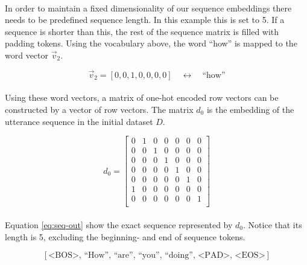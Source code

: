 \documentclass{article}
\begin{document}
\paragraph{}
In order to maintain a fixed dimensionality of our sequence embeddings there
needs to be predefined sequence length. In this example this is set to 5. If a
sequence is shorter than this, the rest of the sequence matrix is filled with
padding tokens. Using the vocabulary above, the word ``how'' is mapped to the
word vector $\vec{v}_2$.

\begin{equation}
  \vec{v}_2 = [0, 0, 1, 0, 0, 0, 0] \quad {\leftrightarrow} \quad \textrm{``how''}
\end{equation}

\paragraph{}
Using these word vectors, a matrix of one-hot encoded row vectors can be
constructed by a vector of row vectors. The matrix $d_0$ is the embedding of
the utterance sequence in the initial dataset $D$.  

\begin{equation}
  d_{0} = 
    \begin{bmatrix}
      0 & 1 & 0 & 0 & 0 & 0 & 0\\
      0 & 0 & 1 & 0 & 0 & 0 & 0\\
      0 & 0 & 0 & 1 & 0 & 0 & 0\\
      0 & 0 & 0 & 0 & 1 & 0 & 0\\
      0 & 0 & 0 & 0 & 0 & 1 & 0\\
      1 & 0 & 0 & 0 & 0 & 0 & 0\\
      0 & 0 & 0 & 0 & 0 & 0 & 1\\
    \end{bmatrix}
\end{equation}

\paragraph{}
Equation \ref{eq:seq-out} show the exact sequence represented by $d_0$. Notice
that its length is 5, excluding the beginning- and end of sequence tokens.

\begin{equation} \label{eq:seq-out}
  [ \textrm{<BOS>},\, \textrm{``How''},\, \textrm{``are''},\, \textrm{``you''},\,
    \textrm{``doing''},\, \textrm{<PAD>},\, \textrm{<EOS>} ]
\end{equation}
\end{document}
